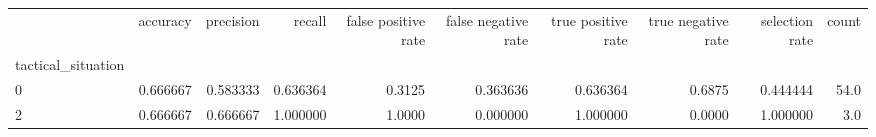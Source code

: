 \begin{tabular}{lrrrrrrrrr}
\toprule
{} &  accuracy &  precision &    recall &  false positive rate &  false negative rate &  true positive rate &  true negative rate &  selection rate &  count \\
tactical\_situation &           &            &           &                      &                      &                     &                     &                 &        \\
\midrule
0                  &  0.666667 &   0.583333 &  0.636364 &               0.3125 &             0.363636 &            0.636364 &              0.6875 &        0.444444 &   54.0 \\
2                  &  0.666667 &   0.666667 &  1.000000 &               1.0000 &             0.000000 &            1.000000 &              0.0000 &        1.000000 &    3.0 \\
\bottomrule
\end{tabular}
